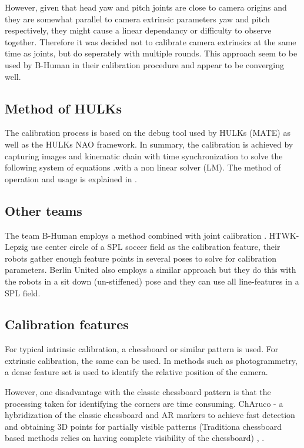\documentclass[english, printversion, nomenclature, notitle]{tuvisionthesis} %
\begin{document}
However, given that head yaw and pitch joints are close to camera origins and they are somewhat parallel to camera extrinsic parameters yaw and pitch respectively, they might cause a linear dependancy or difficulty to observe together. Therefore it was decided not to calibrate camera extrinsics at the same time as joints, but do seperately with multiple rounds. This approach seem to be used by B-Human in their calibration procedure \cite{thomas_rofer_b-human_2018} and appear to be converging well. 

\subsection{Method of HULKs}

The calibration process is based on the debug tool used by HULKs (MATE) as well as the HULKs NAO framework. In summary, the calibration is achieved by capturing images and kinematic chain with time synchronization to solve the following system of equations .with a non linear solver (LM). The method of operation and usage is explained in \cite{darshana_adikari_team_2017}.

\subsection{Other teams}
The team B-Human employs a method combined with joint calibration \cite{thomas_rofer_b-human_2018}. HTWK-Lepzig use center circle of a SPL soccer field as the calibration feature, their robots gather enough feature points in several poses to solve for calibration parameters. Berlin United also employs a similar approach but they do this with the robots in a sit down (un-stiffened) pose and they can use all line-features in a SPL field. 

\subsection{Calibration features}

For typical intrinsic calibration, a chessboard or similar pattern is used. For extrinsic calibration, the same can be used. In methods such as photogrammetry, a dense feature set is used to identify the relative position of the camera. 

However, one disadvantage with the classic chessboard pattern is that the processing taken for identifying the corners are time consuming. ChAruco - a hybridization of the classic chessboard and AR markers to achieve fast detection and obtaining 3D points for partially visible patterns (Traditiona chessboard based methods relies on having complete visibility of the chessboard) \cite{garrido-jurado_generation_2016}, \cite{romero-ramirez_speeded_2018}.
\end{document}
